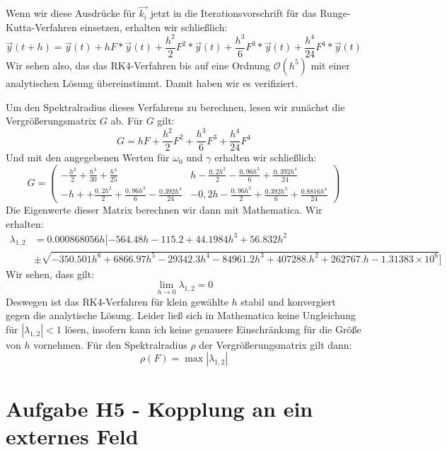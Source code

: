 \documentclass[12pt,a4paper]{article}
\begin{document}
Wenn wir diese Ausdrücke für $\vec{k_i}$ jetzt in die Iterationsvorschrift für das Runge-Kutta-Verfahren einsetzen, erhalten wir schließlich:
\begin{equation}
	\vec{y}(t+h) = \vec{y}(t) + hF*\vec{y}(t) + \frac{h^2}{2}F^2*\vec{y}(t) + \frac{h^3}{6}F^3*\vec{y}(t) + \frac{h^4}{24}F^4*\vec{y}(t)
\end{equation}
Wir sehen also, das das RK4-Verfahren bis auf eine Ordnung $\mathcal{O}(h^5)$ mit einer analytischen Lösung übereinstimmt. Damit haben wir es verifiziert.

Um den Spektralradius dieses Verfahrens zu berechnen, lesen wir zunächst die Vergrößerungsmatrix $G$ ab. Für $G$ gilt:
\begin{equation*}
	G = hF + \frac{h^2}{2}F^2 + \frac{h^3}{6}F^3 + \frac{h^4}{24}F^4
\end{equation*}
Und mit den angegebenen Werten für $\omega_0$ und $\gamma$ erhalten wir schließlich:
\begin{equation}
	G = \begin{pmatrix}
	-\frac{h^2}{2}+\frac{h^3}{30}+\frac{h^4}{25} & h-\frac{0,2h^2}{2} - \frac{0,96h^3}{6} + \frac{0,392h^4}{24}\\
	-h++\frac{0,2h^2}{2} + \frac{0,96h^3}{6} - \frac{0.392h^4}{24} & -0,2h-\frac{0,96h^2}{2} + \frac{0.392h^3}{6} + \frac{0.8816h^4}{24}
	\end{pmatrix}
\end{equation}
Die Eigenwerte dieser Matrix berechnen wir dann mit Mathematica. Wir erhalten:
\begin{align*}
	\lambda_{1,2} &=0.000868056 h [-564.48 h-115.2+44.1984 h^3+56.832 h^2 \\
	& \pm \sqrt{-350.501 h^6+6866.97 h^5-29342.3 h^4-84961.2 h^3+407288.h^2+262767. h-1.31383\times 10^6}]
\end{align*}
Wir sehen, dass gilt:
\begin{equation*}
	\lim_{h \to 0}\lambda_{1,2} = 0
\end{equation*}
Deswegen ist das RK4-Verfahren für klein gewählte $h$ stabil und konvergiert gegen die analytische Lösung. Leider ließ sich in Mathematica keine Ungleichung für $|\lambda_{1,2}| < 1$ lösen, insofern kann ich keine genauere Einschränkung für die Größe von $h$ vornehmen. Für den Spektralradius $\rho$ der Vergrößerungsmatrix gilt dann:
\begin{equation*}
	\rho(F) = \max|\lambda_{1,2}|
\end{equation*}


\section{Aufgabe  H5 - Kopplung an ein externes Feld}
\end{document}
